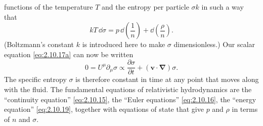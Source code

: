 functions of the temperature \(T\) and the entropy per particle \(\sigma k\)
in such a way that
\begin{equation}
  kT\,\dd\sigma=p\,\dd\left(\frac1n\right)
  +\dd\left(\frac{\rho}{n}\right).
  \tag{2.10.18}\label{eq:2.10.18}
\end{equation}
(Boltzmann's constant \(k\) is introduced here to make \(\sigma\)
dimensionless.) Our scalar equation \eqref{eq:2.10.17a} can now be written
\begin{equation}
  0=U^\mu\partial_\mu\sigma
  \propto\frac{\partial\sigma}{\partial t}
  +(\mathbf v\cdot\boldsymbol{\nabla})\sigma .
  \tag{2.10.19}\label{eq:2.10.19}
\end{equation}
The specific entropy \(\sigma\) is therefore constant in time at any point
that moves along with the fluid. The fundamental equations of relativistic
hydrodynamics are the ``continuity equation'' \eqref{eq:2.10.15}, the ``Euler
equations'' \eqref{eq:2.10.16}, the ``energy equation''
\eqref{eq:2.10.19}, together with equations of state that give \(p\) and
\(\rho\) in terms of \(n\) and \(\sigma\).


